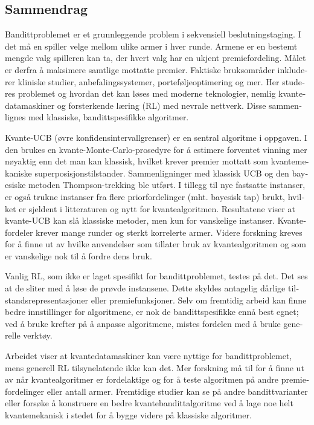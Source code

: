 \begin{otherlanguage}{norsk}

  \chapter{Sammendrag}
  Bandittproblemet er et grunnleggende problem i sekvensiell beslutningstaging.
  I det må en spiller velge mellom ulike armer i hver runde.
  Armene er en bestemt mengde valg spilleren kan ta, der hvert valg har en ukjent premiefordeling.
  Målet er derfra å maksimere samtlige mottatte premier.
  Faktiske bruksområder inkluderer kliniske studier, anbefalingssystemer, porteføljeoptimering og mer.
  Her studeres problemet og hvordan det kan løses med moderne teknologier, nemlig kvantedatamaskiner og forsterkende læring (RL) med nevrale nettverk.
  Disse sammenlignes med klassiske, bandittspesifikke algoritmer.

  Kvante-UCB (øvre konfidensintervallgrenser) er en sentral algoritme i oppgaven.
  I den brukes en kvante-Monte-Carlo-prosedyre for å estimere forventet vinning mer nøyaktig enn det man kan klassisk, hvilket krever premier mottatt som kvantemekaniske superposisjonstilstander.
  Sammenligninger med klassisk UCB og den bayesiske metoden Thompson-trekking ble utført.
  I tillegg til nye fastsatte instanser, er også trukne instanser fra flere priorfordelinger (mht. bayesisk tap) brukt, hvilket er sjeldent i litteraturen og nytt for kvantealgoritmen.
  Resultatene viser at kvante-UCB kan slå klassiske metoder, men kun for vanskelige instanser.
  Kvantefordeler krever mange runder og sterkt korrelerte armer.
  Videre forskning kreves for å finne ut av hvilke anvendelser som tillater bruk av kvantealgoritmen og som er vanskelige nok til å fordre dens bruk.

  Vanlig RL, som ikke er laget spesifikt for bandittproblemet, testes på det.
  Det ses at de sliter med å løse de prøvde instansene.
  Dette skyldes antagelig dårlige tilstandsrepresentasjoner eller premiefunksjoner.
  Selv om fremtidig arbeid kan finne bedre innstillinger for algoritmene, er nok de bandittspesifikke ennå best egnet; ved å bruke krefter på å anpasse algoritmene, mistes fordelen med å bruke generelle verktøy.

  Arbeidet viser at kvantedatamaskiner kan være nyttige for bandittproblemet, mens generell RL tilsynelatende ikke kan det.
  Mer forskning må til for å finne ut av når kvantealgoritmer er fordelaktige og for å teste algoritmen på andre premiefordelinger eller antall armer.
  Fremtidige studier kan se på andre bandittvarianter eller forsøke å konstruere en bedre kvantebandittalgoritme ved å lage noe helt kvantemekanisk i stedet for å bygge videre på klassiske algoritmer.

\end{otherlanguage}

\cleardoublepage